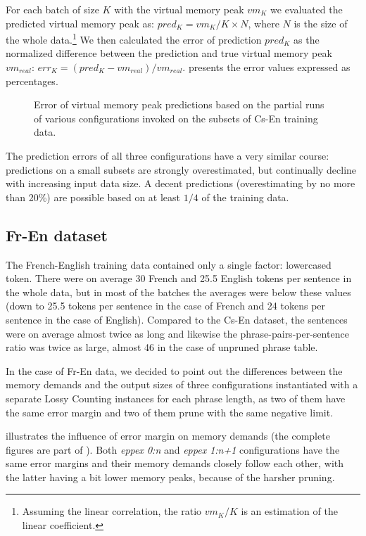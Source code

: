 For each batch of size $K$ with the virtual memory peak $vm_{K}$ we evaluated the predicted virtual
memory peak as: $pred_{K} = vm_{K} / K \times N$, where $N$ is the size of the whole
data.\footnote{Assuming the linear correlation, the ratio $vm_{K} / K$ is an estimation of the linear coefficient.}
We then calculated the error of prediction $pred_{K}$ as the normalized difference between
the prediction and true virtual memory peak $vm_{real}$: $err_{K} = (pred_{K} - vm_{real}) / vm_{real}$.
 presents the error values expressed as percentages.

\begin{figure}[!htb]
  \centering
  
  \caption{
    Error of virtual memory peak predictions based on the partial runs of various \eppex{} configurations
    invoked on the subsets of Cs-En training data.
  }
  \label{fig:cs-en-vm-peak-prediction}
\end{figure}

The prediction errors of all three configurations have a very similar course: predictions on a small
subsets are strongly overestimated, but continually decline with increasing input data size.
A decent predictions (overestimating by no more than 20\%) are possible based on at least $1/4$ of
the training data.

\subsection{Fr-En dataset}

The French-English training data contained only a single factor: lowercased token.
There were on average 30 French and 25.5 English tokens per sentence in the whole data,
but in most of the batches the averages were below these values (down to 25.5 tokens
per sentence in the case of French and 24 tokens per sentence in the case of English).
Compared to the Cs-En dataset, the sentences were on average almost twice as long and
likewise the phrase-pairs-per-sentence ratio was twice as large, almost 46 in the case of
unpruned phrase table.

In the case of Fr-En data, we decided to point out the differences between the memory demands
and the output sizes of three \eppex{} configurations instantiated with a separate Lossy Counting
instances for each phrase length, as two of them have the same error margin and two of them
prune with the same negative limit.

 illustrates the influence of error margin on \eppex{} memory demands
(the complete figures are part of ).
Both \emph{eppex 0:n} and \emph{eppex 1:n+1} configurations have the same error margins and
their memory demands closely follow each other, with the latter having a bit lower memory
peaks, because of the harsher pruning.

